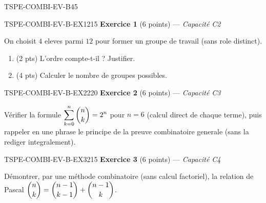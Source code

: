 

\begin{evaluation}{TSPE-COMBI-EV-B}{45}

\begin{exercice}{TSPE-COMBI-EV-B-EX1}{2}{15}
\textbf{Exercice 1} (6 points) — \textit{Capacité C2}

\medskip

On choisit $4$ eleves parmi $12$ pour former un groupe de travail (sans role distinct).
\begin{enumerate}
  \item (2 pts) L'ordre compte-t-il ? Justifier.
  \item (4 pts) Calculer le nombre de groupes possibles.
\end{enumerate}
\end{exercice}

\begin{exercice}{TSPE-COMBI-EV-B-EX2}{2}{20}
\textbf{Exercice 2} (6 points) — \textit{Capacité C3}

\medskip

Vérifier la formule $\displaystyle\sum_{k=0}^{n}\dbinom{n}{k}=2^n$ pour $n=6$ (calcul direct de chaque terme), puis rappeler en une phrase le principe de la preuve combinatoire generale (sans la rediger integralement).
\end{exercice}

\begin{exercice}{TSPE-COMBI-EV-B-EX3}{2}{15}
\textbf{Exercice 3} (6 points) — \textit{Capacité C4}

\medskip

Démontrer, par une méthode combinatoire (sans calcul factoriel), la relation de Pascal $\dbinom{n}{k} = \dbinom{n-1}{k-1}+\dbinom{n-1}{k}$.
\end{exercice}


\end{evaluation}
